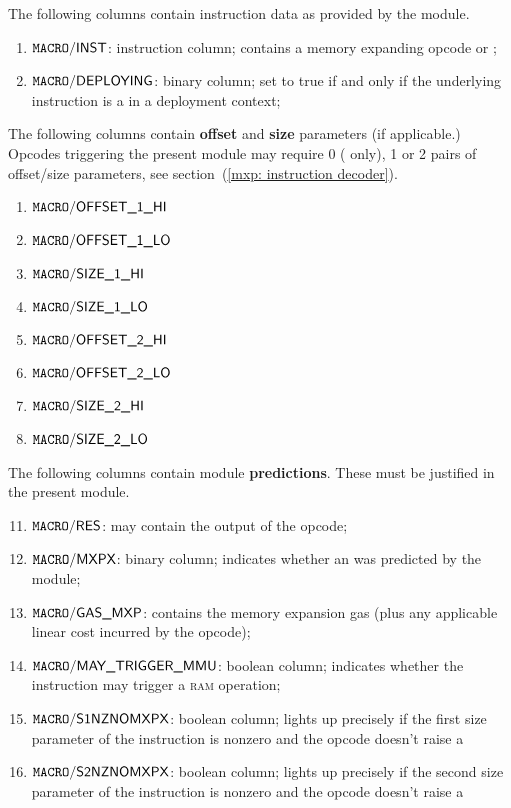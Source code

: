 The following columns contain instruction data as provided by the \hubMod{} module.
\begin{enumerate}
	\item
		\godGiven{}
		$\texttt{MACRO}\textsf{/}{\textsf{INST}}$:
		instruction column;
		contains a memory expanding opcode or ;
	\item
		\godGiven{}
		$\texttt{MACRO}\textsf{/}{\textsf{DEPLOYING}}$:
		binary column;
		set to true if and only if the underlying instruction is a  in a deployment context;
\end{enumerate}
The following columns contain \textbf{offset} and \textbf{size} parameters (if applicable.)
Opcodes triggering the present module may require 0 ( only), 1 or 2 pairs of offset/size parameters,
see section~(\ref{mxp: instruction decoder}).
\begin{multicols}{2}
	\begin{enumerate}[resume]
		\item
			\godGiven{}
			$\texttt{MACRO}\textsf{/}{\textsf{OFFSET\_1\_HI}}$
		\item
			\godGiven{}
			$\texttt{MACRO}\textsf{/}{\textsf{OFFSET\_1\_LO}}$
		\item
			\godGiven{}
			$\texttt{MACRO}\textsf{/}{\textsf{SIZE\_1\_HI}}$
		\item
			\godGiven{}
			$\texttt{MACRO}\textsf{/}{\textsf{SIZE\_1\_LO}}$
		\item
			\godGiven{}
			$\texttt{MACRO}\textsf{/}{\textsf{OFFSET\_2\_HI}}$
		\item
			\godGiven{}
			$\texttt{MACRO}\textsf{/}{\textsf{OFFSET\_2\_LO}}$
		\item
			\godGiven{}
			$\texttt{MACRO}\textsf{/}{\textsf{SIZE\_2\_HI}}$
		\item
			\godGiven{}
			$\texttt{MACRO}\textsf{/}{\textsf{SIZE\_2\_LO}}$
	\end{enumerate}
\end{multicols}
The following columns contain \hubMod{} module \textbf{predictions}.
These must be justified in the present module.
\begin{enumerate}[resume] \setcounter{enumi}{10}
	\item
		\godGiven{}
		\markAsJustifiedHere{}
		$\texttt{MACRO}\textsf{/}{\textsf{RES}}$:
		may contain the output of the  opcode;
	\item
		\godGiven{}
		\markAsJustifiedHere{}
		$\texttt{MACRO}\textsf{/}{\textsf{MXPX}}$:
		binary column;
		indicates whether an \mxpxSH{} was predicted by the \hubMod{} module;
	\item
		\godGiven{}
		\markAsJustifiedHere{}
		$\texttt{MACRO}\textsf{/}{\textsf{GAS\_MXP}}$:
		contains the memory expansion gas (plus any applicable linear cost incurred by the opcode);
	\item
		\godGiven{}
		\markAsJustifiedHere{}
		$\texttt{MACRO}\textsf{/}{\textsf{MAY\_TRIGGER\_MMU}}$:
		boolean column;
		indicates whether the instruction may trigger a \textsc{ram} operation;
	\item
		\godGiven{}
		\markAsJustifiedHere{}
		$\texttt{MACRO}\textsf{/}{\textsf{S1NZNOMXPX}}$:
		boolean column;
		lights up precisely if the first size parameter of the instruction is nonzero and the opcode doesn't raise a \mxpxSH{}
	\item
		\godGiven{}
		\markAsJustifiedHere{}
		$\texttt{MACRO}\textsf{/}{\textsf{S2NZNOMXPX}}$:
		boolean column;
		lights up precisely if the second size parameter of the instruction is nonzero and the opcode doesn't raise a \mxpxSH{}
\end{enumerate}
